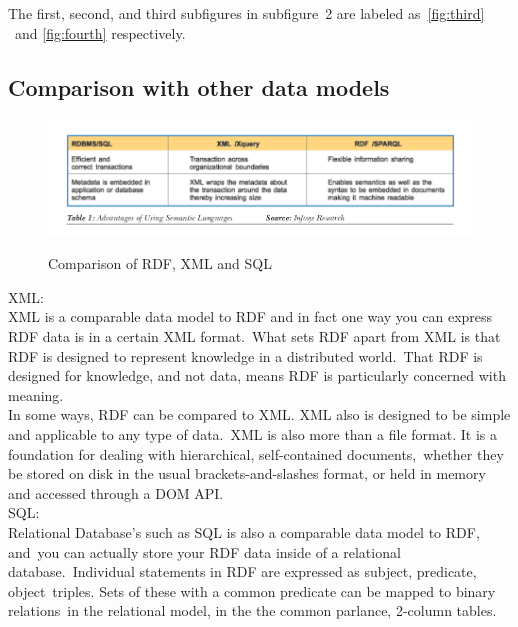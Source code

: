 \documentclass[DIV=calc, paper=a4, fontsize=12pt, onecolumn]{scrartcl}	 %
\begin{document}
  \noindent The first, second, and third subfigures in subfigure\
  2 are labeled as\
  \ref{fig:third} \cite{parachuri2008role}\
  and \ref{fig:fourth}  \cite{_Borden_2013} respectively.\\


 \subsection{Comparison with other data models}

  \begin{figure}[ht!]
    \centering
    \includegraphics[scale=0.5]{sqlrdf.png}
    \caption{Comparison of RDF, XML and SQL}
    \citep[Fig.~1]{parachuri2008role}
    \label{fig:nwhin}
  \end{figure}  

  XML:\\

  \noindent XML is a comparable data model to RDF and in fact one way you can express RDF data is in a certain XML format.\
  What sets RDF apart from XML is that RDF is designed to represent knowledge in a distributed world.\
  That RDF is designed for knowledge, and not data, means RDF is particularly concerned with meaning.\\

  \noindent In some ways, RDF can be compared to XML. XML also is designed to be simple and applicable to any type of data.\
  XML is also more than a file format. It is a foundation for dealing with hierarchical, self-contained documents,\
  whether they be stored on disk in the usual brackets-and-slashes format, or held in memory and accessed through a DOM API.\
  \citep{_rdf_about_2013}\\

  \noindent SQL: \\

  \noindent Relational Database’s such as SQL is also a comparable data model to RDF, and\
  you can actually store your RDF data inside of a relational database.\
  Individual statements in RDF are expressed as subject, predicate, object\ 
  triples. Sets of these with a common predicate can be mapped to binary relations\
  in the relational model, in the the common parlance, 2-column tables.\\
\end{document}
